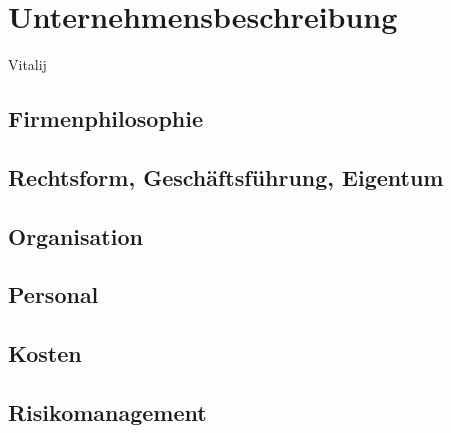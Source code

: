 
\section{Unternehmensbeschreibung}
Vitalij

\subsection{Firmenphilosophie}
\subsection{Rechtsform, Geschäftsführung, Eigentum}
\subsection{Organisation}
\subsection{Personal}
\subsection{Kosten}
\subsection{Risikomanagement}